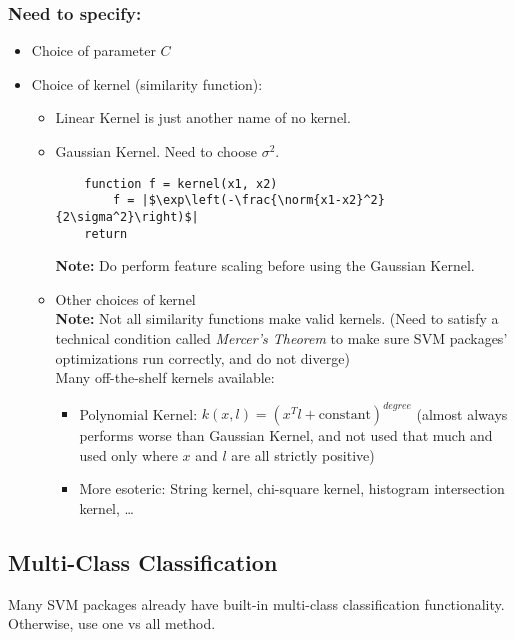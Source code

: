 \subsubsection{Need to specify:}
\begin{itemize}
	\item Choice of parameter $C$
	\item Choice of kernel (similarity function):\begin{itemize}
		      \item Linear Kernel is just another name of no kernel.
		      \item Gaussian Kernel. Need to choose $\sigma^2$.
		            \begin{verbatim}
	function f = kernel(x1, x2)
		f = |$\exp\left(-\frac{\norm{x1-x2}^2}{2\sigma^2}\right)$|
	return
					  \end{verbatim}
		            \textbf{Note:} Do perform feature scaling before using
		            the Gaussian Kernel.
		      \item Other choices of kernel \\
		            \textbf{Note: }Not all similarity functions make valid kernels. (Need to
		            satisfy a technical condition called \emph{Mercer's Theorem} to
		            make sure SVM packages' optimizations run correctly, and do not
		            diverge)\\
		            Many off-the-shelf kernels available:\begin{itemize}
			            \item Polynomial Kernel: $k(x,l) = (x^Tl + \text{constant})^{degree}$
			                  (almost always performs worse than Gaussian Kernel, and not used
			                  that much and used only where $x$ and $l$ are all strictly
			                  positive)
			            \item More esoteric: String kernel, chi-square kernel, histogram
			                  intersection kernel, \dots
		            \end{itemize}
	      \end{itemize}
\end{itemize}

\subsection{Multi-Class Classification}
Many SVM packages already have built-in multi-class classification functionality.
Otherwise, use one vs all method.

